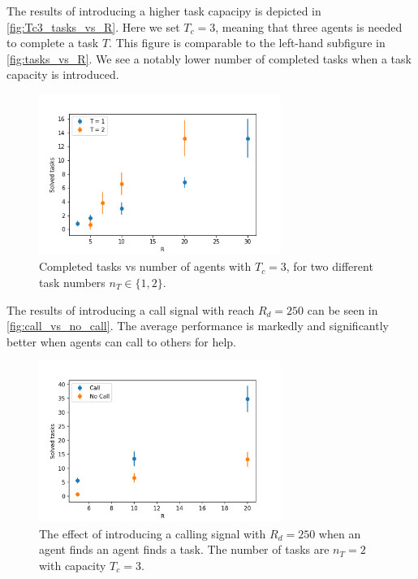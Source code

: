 \documentclass[11pt]{article}
\begin{document}
    The results of introducing a higher task capacipy is depicted in
    \autoref{fig:Tc3_tasks_vs_R}. Here we set $T_c=3$, meaning that 
    three agents is needed to complete a task $T$. This figure is 
    comparable to the left-hand subfigure in \autoref{fig:tasks_vs_R}.
    We see a notably lower number of completed tasks when a task 
    capacity is introduced.

    \begin{figure}
        \centering
        \includegraphics[width=0.7\textwidth]{figures/Tc3_tasks_vs_R.png}
        \caption{
            Completed tasks vs number of agents with $T_c=3$, for two different 
            task numbers $n_T \in \{1, 2\}$.
        }
        \label{fig:Tc3_tasks_vs_R}
    \end{figure}

    The results of introducing a call signal with reach $R_d=250$ can be 
    seen in \autoref{fig:call_vs_no_call}. The average performance is 
    markedly and significantly better when agents can call to others for help.

    \begin{figure}
        \centering
        \includegraphics[width=0.7\textwidth]{figures/call_vs_no_call.png} 
        \caption{
            The effect of introducing a calling signal with $R_d=250$ when an 
            agent finds an agent finds a task. The number of tasks are $n_T=2$ 
            with capacity $T_c=3$.
        }
        \label{fig:call_vs_no_call}
    \end{figure}
\end{document}
